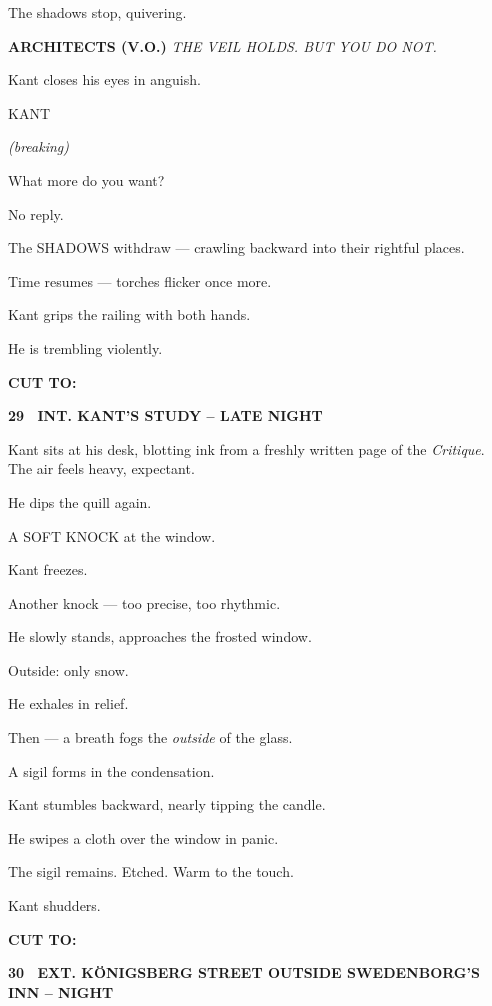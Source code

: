 \documentclass[12pt]{article}
\newcommand{\scene}[2]{%
  \vspace{1.8\baselineskip}%
  \noindent\textbf{#1 \ #2}\par\vspace{0.4\baselineskip}%
}
\newenvironment{dialogue}[1]{%
  \vspace{0.8\baselineskip}%
  \noindent\hspace*{2.3in}\textsc{#1}\par%
  \noindent\hspace*{1.5in}\begin{minipage}[t]{4.5in}%
}{%
  \end{minipage}\par%
}
\newcommand{\paren}[1]{%
  \noindent\hspace*{1.8in}\textit{(#1)}\par%
}
\newcommand{\transition}[1]{%
  \vspace{0.6\baselineskip}%
  \begin{flushright}\textbf{#1}\end{flushright}%
}
\begin{document}
The shadows stop, quivering.

\textbf{ARCHITECTS (V.O.)}  
\emph{THE VEIL HOLDS. BUT YOU DO NOT.}

Kant closes his eyes in anguish.

\begin{dialogue}{KANT}
\paren{breaking}
What more do you want?
\end{dialogue}

No reply.

The SHADOWS withdraw — crawling backward into their rightful places.

Time resumes — torches flicker once more.

Kant grips the railing with both hands.

He is trembling violently.

\transition{CUT TO:}


\scene{29}{INT. KANT’S STUDY -- LATE NIGHT}

Kant sits at his desk, blotting ink from a freshly written page of the
\textit{Critique}. The air feels heavy, expectant.

He dips the quill again.

A SOFT KNOCK at the window.

Kant freezes.

Another knock — too precise, too rhythmic.

He slowly stands, approaches the frosted window.

Outside: only snow.

He exhales in relief.

Then — a breath fogs the \emph{outside} of the glass.

A sigil forms in the condensation.

Kant stumbles backward, nearly tipping the candle.

He swipes a cloth over the window in panic.

The sigil remains. Etched. Warm to the touch.

Kant shudders.

\transition{CUT TO:}


\scene{30}{EXT. KÖNIGSBERG STREET OUTSIDE SWEDENBORG'S INN -- NIGHT}
\end{document}
